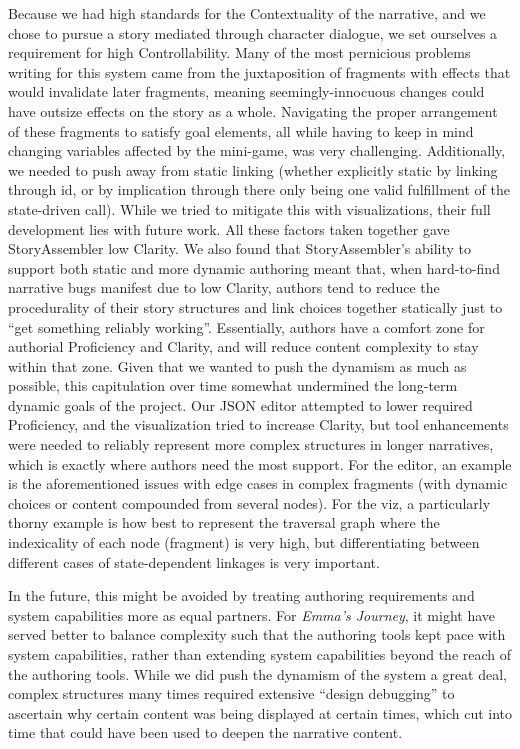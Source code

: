 Because we had high standards for the Contextuality of the narrative, and we chose to pursue a story mediated through character dialogue, we set ourselves a requirement for high Controllability. Many of the most pernicious problems writing for this system came from the juxtaposition of fragments with effects that would invalidate later fragments, meaning seemingly-innocuous changes could have outsize effects on the story as a whole.
Navigating the proper arrangement of these fragments to satisfy goal elements, all while having to keep in mind changing variables affected by the mini-game, was very challenging. Additionally, we needed to push away from static linking (whether explicitly static by linking through id, or by implication through there only being one valid fulfillment of the state-driven call). While we tried to mitigate this with visualizations, their full development lies with future work. All these factors taken together gave StoryAssembler low Clarity. 
We also found that StoryAssembler's ability to support both static and more dynamic authoring meant that, when hard-to-find narrative bugs manifest due to low Clarity, authors tend to reduce the procedurality of their story structures and link choices together statically just to ``get something reliably working''. Essentially, authors have a comfort zone for authorial Proficiency and Clarity, and will reduce content complexity to stay within that zone. Given that we wanted to push the dynamism as much as possible, this capitulation over time somewhat undermined the long-term dynamic goals of the project. Our JSON editor attempted to lower required Proficiency, and the visualization tried to increase Clarity, but tool enhancements were needed to reliably represent more complex structures in longer narratives, which is exactly where authors need the most support. For the editor, an example is the aforementioned issues with edge cases in complex fragments (with dynamic choices or content compounded from several nodes). For the viz, a particularly thorny example is how best to represent the traversal graph where the indexicality of each node (fragment) is very high, but differentiating between different cases of state-dependent linkages is very important.

In the future, this might be avoided by treating authoring requirements and system capabilities more as equal partners. For \textit{Emma's Journey}, it might have served better to balance complexity such that the authoring tools kept pace with system capabilities, rather than extending system capabilities beyond the reach of the authoring tools. While we did push the dynamism of the system a great deal, complex structures many times required extensive ``design debugging'' to ascertain why certain content was being displayed at certain times, which cut into time that could have been used to deepen the narrative content.

